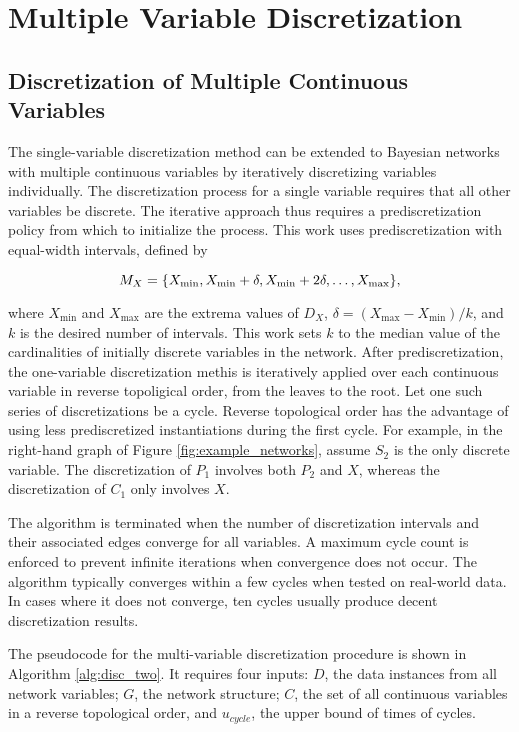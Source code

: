\section{Multiple Variable Discretization}
\label{sec:multi_var}

\subsection{Discretization of Multiple Continuous Variables}

The single-variable discretization method can be extended to Bayesian networks with multiple continuous variables by iteratively discretizing variables individually.
The discretization process for a single variable requires that all other variables be discrete.
The iterative approach thus requires a prediscretization policy from which to initialize the process.
This work uses prediscretization with equal-width intervals, defined by

\begin{equation}
M_X = \curly{X_\text{min}, X_\text{min} + \delta, X_\text{min} + 2\delta, \ldots, X_\text{max}}\text{,}
\end{equation}

\noindent
where $X_\text{min}$ and $X_\text{max}$ are the extrema values of $D_X$, $\delta = (X_\text{max} - X_\text{min})/k$, and $k$ is the desired number of intervals.
This work sets $k$ to the median value of the cardinalities of initially discrete variables in the network.
After prediscretization, the one-variable discretization methis is iteratively applied over each continuous variable in reverse topoligical order, from the leaves to the root.
Let one such series of discretizations be a cycle.
Reverse topological order has the advantage of using less prediscretized instantiations during the first cycle.
For example, in the right-hand graph of Figure \ref{fig:example_networks}, assume $S_2$ is the only discrete variable.
The discretization of $P_1$ involves both $P_2$ and $X$, whereas the discretization of $C_1$ only involves $X$.

The algorithm is terminated when the number of discretization intervals and their associated edges converge for all variables.
A maximum cycle count is enforced to prevent infinite iterations when convergence does not occur.
The algorithm typically converges within a few cycles when tested on real-world data.
In cases where it does not converge, ten cycles usually produce decent discretization results.

The pseudocode for the multi-variable discretization procedure is shown in Algorithm \ref{alg:disc_two}.
It requires four inputs: $D$, the data instances from all network variables; $G$, the network structure; $C$, the set of all continuous variables in a reverse topological order, and $u_{cycle}$, the upper bound of times of cycles.

